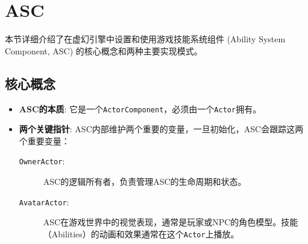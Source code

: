 \documentclass[10pt,CJKmath]{zhbook-v1}
\begin{document}
\section{ASC}
本节详细介绍了在虚幻引擎中设置和使用游戏技能系统组件 (Ability System Component, ASC) 的核心概念和两种主要实现模式。

\subsection{核心概念}
\begin{itemize}
    \item \textbf{ASC的本质}: 它是一个\texttt{ActorComponent}，必须由一个\texttt{Actor}拥有。
    \item \textbf{两个关键指针}: ASC内部维护两个重要的变量，一旦初始化，ASC会跟踪这两个重要变量：
    \begin{description}
        \item[\texttt{OwnerActor}:] ASC的逻辑所有者，负责管理ASC的生命周期和状态。
        \item[\texttt{AvatarActor}:] ASC在游戏世界中的视觉表现，通常是玩家或NPC的角色模型。技能（Abilities）的动画和效果通常在这个\texttt{Actor}上播放。
    \end{description}
\end{itemize}
\end{document}
